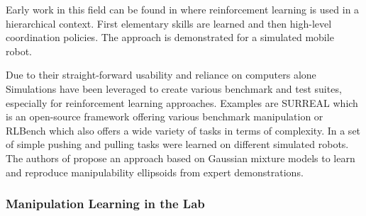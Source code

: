 Early work in this field can be found in \cite{Lin.1993} where reinforcement learning is used in a hierarchical context.
First elementary skills are learned and then high-level coordination policies.
The approach is demonstrated for a simulated mobile robot.

Due to their straight-forward usability and reliance on computers alone Simulations have been leveraged to create various benchmark and test suites, especially for reinforcement learning approaches.
Examples are SURREAL \cite{LinxiFan.2018} which is an open-source framework offering various benchmark manipulation or RLBench \cite{James.2020} which also offers a wide variety of tasks in terms of complexity. 
In \cite{Devin.2017} a set of simple pushing and pulling tasks were learned on different simulated robots.
The authors of \cite{Rozo.2017} propose an approach based on Gaussian mixture models to learn and reproduce manipulability ellipsoids from expert demonstrations.


\subsubsection{Manipulation Learning in the Lab}

